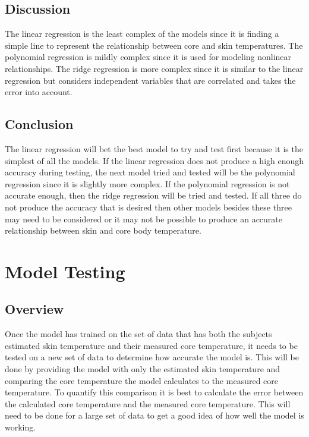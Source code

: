 \documentclass[onecolumn, draftclsnofoot,10pt, compsoc]{IEEEtran}
\begin{document}
		\subsection{Discussion}
		
		The linear regression is the least complex of the models since it is finding a simple line to represent the relationship between core and skin temperatures. The polynomial regression is mildly complex since it is used for modeling nonlinear relationships. The ridge regression is more complex since it is similar to the linear regression but considers independent variables that are correlated and takes the error into account.

		\subsection{Conclusion}	

        The linear regression will bet the best model to try and test first because it is the simplest of all the models. If the linear regression does not produce a high enough accuracy during testing, the next model tried and tested will be the polynomial regression since it is slightly more complex. If the polynomial regression is not accurate enough, then the ridge regression will be tried and tested. If all three do not produce the accuracy that is desired then other models besides these three may need to be considered or it may not be possible to produce an accurate relationship between skin and core body temperature. 

	\section{Model Testing}
		\subsection{Overview}
        
        Once the model has trained on the set of data that has both the subjects estimated skin temperature and their measured core temperature, it needs to be tested on a new set of data to determine how accurate the model is. This will be done by providing the model with only the estimated skin temperature and comparing the core temperature the model calculates to the measured core temperature. To quantify this comparison it is best to calculate the error between the calculated core temperature and the measured core temperature. This will need to be done for a large set of data to get a good idea of how well the model is working.
        
\end{document}

